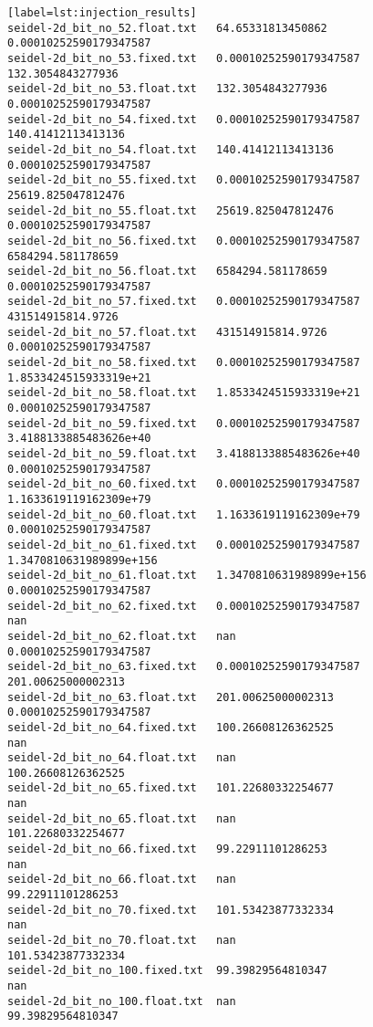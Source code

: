 \begin{verbatim}[label=lst:injection_results]
seidel-2d_bit_no_52.float.txt   64.65331813450862                       0.00010252590179347587
seidel-2d_bit_no_53.fixed.txt   0.00010252590179347587                  132.3054843277936
seidel-2d_bit_no_53.float.txt   132.3054843277936                       0.00010252590179347587
seidel-2d_bit_no_54.fixed.txt   0.00010252590179347587                  140.41412113413136
seidel-2d_bit_no_54.float.txt   140.41412113413136                      0.00010252590179347587
seidel-2d_bit_no_55.fixed.txt   0.00010252590179347587                  25619.825047812476
seidel-2d_bit_no_55.float.txt   25619.825047812476                      0.00010252590179347587
seidel-2d_bit_no_56.fixed.txt   0.00010252590179347587                  6584294.581178659
seidel-2d_bit_no_56.float.txt   6584294.581178659                       0.00010252590179347587
seidel-2d_bit_no_57.fixed.txt   0.00010252590179347587                  431514915814.9726
seidel-2d_bit_no_57.float.txt   431514915814.9726                       0.00010252590179347587
seidel-2d_bit_no_58.fixed.txt   0.00010252590179347587                  1.8533424515933319e+21
seidel-2d_bit_no_58.float.txt   1.8533424515933319e+21                  0.00010252590179347587
seidel-2d_bit_no_59.fixed.txt   0.00010252590179347587                  3.4188133885483626e+40
seidel-2d_bit_no_59.float.txt   3.4188133885483626e+40                  0.00010252590179347587
seidel-2d_bit_no_60.fixed.txt   0.00010252590179347587                  1.1633619119162309e+79
seidel-2d_bit_no_60.float.txt   1.1633619119162309e+79                  0.00010252590179347587
seidel-2d_bit_no_61.fixed.txt   0.00010252590179347587                  1.3470810631989899e+156
seidel-2d_bit_no_61.float.txt   1.3470810631989899e+156                 0.00010252590179347587
seidel-2d_bit_no_62.fixed.txt   0.00010252590179347587                  nan
seidel-2d_bit_no_62.float.txt   nan                                     0.00010252590179347587
seidel-2d_bit_no_63.fixed.txt   0.00010252590179347587                  201.00625000002313
seidel-2d_bit_no_63.float.txt   201.00625000002313                      0.00010252590179347587
seidel-2d_bit_no_64.fixed.txt   100.26608126362525                      nan
seidel-2d_bit_no_64.float.txt   nan                                     100.26608126362525
seidel-2d_bit_no_65.fixed.txt   101.22680332254677                      nan
seidel-2d_bit_no_65.float.txt   nan                                     101.22680332254677
seidel-2d_bit_no_66.fixed.txt   99.22911101286253                       nan
seidel-2d_bit_no_66.float.txt   nan                                     99.22911101286253
seidel-2d_bit_no_70.fixed.txt   101.53423877332334                      nan
seidel-2d_bit_no_70.float.txt   nan                                     101.53423877332334
seidel-2d_bit_no_100.fixed.txt  99.39829564810347                       nan
seidel-2d_bit_no_100.float.txt  nan                                     99.39829564810347
\end{verbatim}

